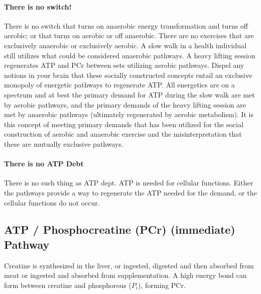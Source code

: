 \paragraph{There is no switch!}
There is no switch that turns on anaerobic energy transformation and turns off aerobic; or that turns on aerobic or off anaerobic. There are no exercises that are exclusively anaerobic or exclusively aerobic. A slow walk in a health individual still utilizes what could be considered anaerobic pathways. A heavy lifting session regenerates ATP and PCr between sets utilizing aerobic pathways. Dispel any notions in your brain that these socially constructed concepts entail an exclusive monopoly of energetic pathways to regenerate ATP. All energetics are on a spectrum and at best the primary demand for ATP during the slow walk are met by aerobic pathways, and the primary demands of the heavy lifting session are met by anaerobic pathways (ultimately regenerated by aerobic metabolism). It is this concept of meeting primary demands that has been utilized for the social construction of aerobic and anaerobic exercise and the misinterpretation that these are mutually exclusive pathways.

\paragraph{There is no ATP Debt}

There is no such thing as ATP dept. ATP is needed for cellular functions. Either the pathways provide a way to regenerate the ATP needed for the demand, or the cellular functions do not occur.


\subsection{ATP / Phosphocreatine (PCr) (immediate) Pathway}


Creatine is synthesized in the liver, or ingested, digested and then absorbed from meat or ingested and absorbed from supplementation.\footnotemark{} A high energy bond can form between creatine and phosphorous ($P_i$), forming PCr.

